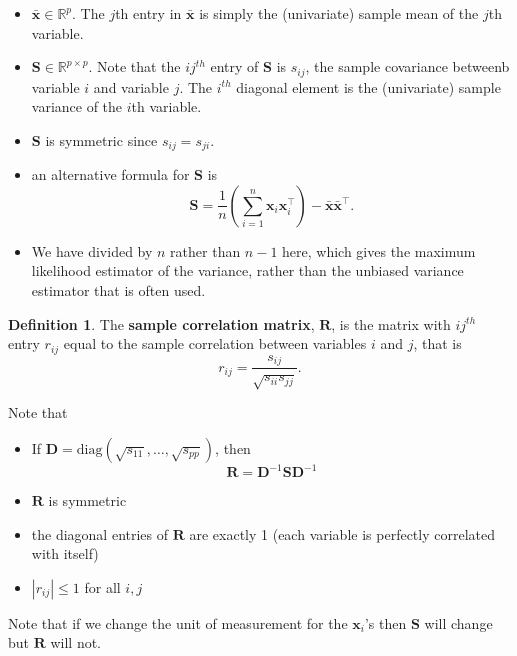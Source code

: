 \documentclass[]{book}
\providecommand{\tightlist}{%
  \setlength{\itemsep}{0pt}\setlength{\parskip}{0pt}}
\theoremstyle{definition}
\newtheorem{definition}{Definition}[chapter]
\theoremstyle{definition}
\theoremstyle{definition}
\theoremstyle{remark}
\begin{document}
\begin{itemize}
\tightlist
\item
  \(\bar{\boldsymbol x} \in \mathbb{R}^p\). The \(j\)th entry in \(\bar{\boldsymbol x}\) is simply the (univariate) sample mean of the \(j\)th variable.
\item
  \(\boldsymbol S\in \mathbb{R}^{p\times p}\). Note that the \(ij^{th}\) entry of \(\boldsymbol S\) is \(s_{ij}\), the sample covariance betweenb variable \(i\) and variable \(j\). The \(i^{th}\) diagonal element is the (univariate) sample variance of the \(i\)th variable.\\
\item
  \(\boldsymbol S\) is symmetric since \(s_{ij}=s_{ji}\).
\item
  an alternative formula for \(\boldsymbol S\) is
  \[\boldsymbol S= \frac{1}{n} \left(\sum_{i=1}^n \boldsymbol x_i \boldsymbol x_i^\top \right)- \bar{\boldsymbol x} \bar{\boldsymbol x}^\top.\]
\item
  We have divided by \(n\) rather than \(n-1\) here, which gives the maximum likelihood estimator of the variance, rather than the unbiased variance estimator that is often used.
\end{itemize}

\begin{definition}
\protect\hypertarget{def:samplecor}{}{\label{def:samplecor} }The \textbf{sample correlation matrix}, \(\boldsymbol R\), is the matrix with \(ij^{th}\) entry \(r_{ij}\) equal to the sample correlation between variables \(i\) and \(j\), that is
\[ r_{ij} = \frac{s_{ij}}{\sqrt{s_{ii}s_{jj}}}. \]
\end{definition}

Note that

\begin{itemize}
\tightlist
\item
  If \(\boldsymbol D= \text{diag}(\sqrt{s_{11}}, \dots, \sqrt{s_{pp}})\), then\\
  \[ \boldsymbol R= \boldsymbol D^{-1} \boldsymbol S\boldsymbol D^{-1} \]
\item
  \(\boldsymbol R\) is symmetric
\item
  the diagonal entries of \(\boldsymbol R\) are exactly 1 (each variable is perfectly correlated with itself)
\item
  \(|r_{ij}| \leq 1\) for all \(i, j\)
\end{itemize}

Note that if we change the unit of measurement for the \(\boldsymbol x_i\)'s then \(\boldsymbol S\) will change but \(\boldsymbol R\) will not.
\end{document}
